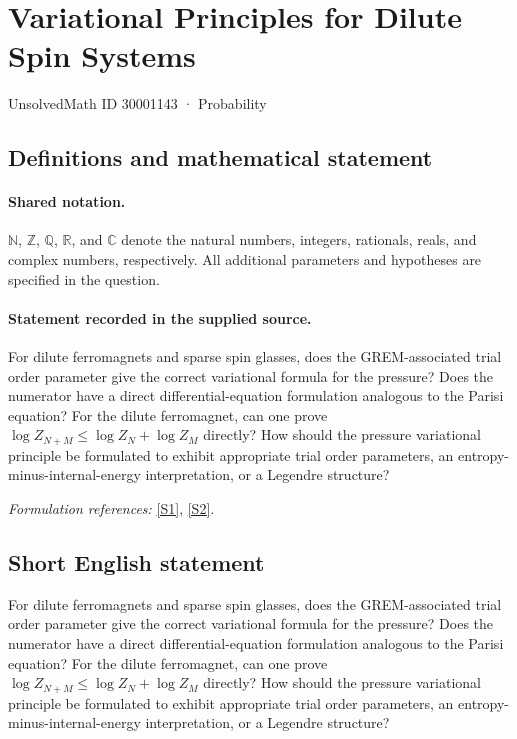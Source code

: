 \documentclass[11pt]{article}
\newcommand{\sref}[2]{\hyperlink{source:#1:#2}{[S#2]}}
\begin{document}
\setcounter{section}{30001142}
\section{Variational Principles for Dilute Spin Systems}\label{30001143}
{\small UnsolvedMath ID 30001143 · Probability}
\subsection{Definitions and mathematical statement}

\paragraph{Shared notation.}$\mathbb N$, $\mathbb Z$, $\mathbb Q$, $\mathbb R$, and $\mathbb C$ denote the natural numbers, integers, rationals, reals, and complex numbers, respectively. All additional parameters and hypotheses are specified in the question.


\paragraph{Statement recorded in the supplied source.}
For dilute ferromagnets and sparse spin glasses, does the GREM-associated trial order parameter give the correct variational formula for the pressure? Does the numerator have a direct differential-equation formulation analogous to the Parisi equation? For the dilute ferromagnet, can one prove $\log Z_{N+M}\leq\log Z_N+\log Z_M$ directly? How should the pressure variational principle be formulated to exhibit appropriate trial order parameters, an entropy-minus-internal-energy interpretation, or a Legendre structure?
\par\smallskip\textit{Formulation references:} \sref{30001143}{1}, \sref{30001143}{2}.
\subsection{Short English statement}
For dilute ferromagnets and sparse spin glasses, does the GREM-associated trial order parameter give the correct variational formula for the pressure? Does the numerator have a direct differential-equation formulation analogous to the Parisi equation? For the dilute ferromagnet, can one prove $\log Z_{N+M}\leq\log Z_N+\log Z_M$ directly? How should the pressure variational principle be formulated to exhibit appropriate trial order parameters, an entropy-minus-internal-energy interpretation, or a Legendre structure?
\end{document}
